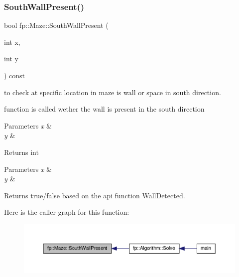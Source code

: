 \subsubsection{\texorpdfstring{South\+Wall\+Present()}{SouthWallPresent()}}
{\footnotesize\ttfamily bool fp\+::\+Maze\+::\+South\+Wall\+Present (\begin{DoxyParamCaption}\item[{int}]{x,  }\item[{int}]{y }\end{DoxyParamCaption}) const}



to check at specific location in maze is wall or space in south direction. 

function is called wether the wall is present in the south direction


\begin{DoxyParams}{Parameters}
{\em x} & \\
\hline
{\em y} & \\
\hline
\end{DoxyParams}
\begin{DoxyReturn}{Returns}
int
\end{DoxyReturn}

\begin{DoxyParams}{Parameters}
{\em x} & \\
\hline
{\em y} & \\
\hline
\end{DoxyParams}
\begin{DoxyReturn}{Returns}
true/false based on the api function Wall\+Detected. 
\end{DoxyReturn}
Here is the caller graph for this function\+:
\nopagebreak
\begin{figure}[H]
\begin{center}
\leavevmode
\includegraphics[width=350pt]{classfp_1_1_maze_a6cc110e308818595983345285245c33f_icgraph}
\end{center}
\end{figure}
\mbox{\label{classfp_1_1_maze_a62c5692927ef95bafad2f0b7ae95a83e}} 
